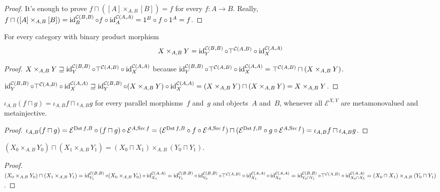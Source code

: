 \begin{proof}
It's enough to prove $f\sqcap([A]\times_{A,B}[B])=f$ for every
$f:A\to B$. Really,
$f\sqcap([A]\times_{A,B}[B])=
\operatorname{id}^{\mathcal{C}(B,B)}_B\circ f\circ\operatorname{id}^{\mathcal{C}(A,A)}_A=
1^B\circ f\circ 1^A=f$.
\end{proof}

\begin{prop}
For every category with binary product morphism
\[X\times_{A,B}Y=
\operatorname{id}^{\mathcal{C}(B,B)}_Y\circ\top^{\mathcal{C}(A,B)}\circ
\operatorname{id}^{\mathcal{C}(A,A)}_X\]
\end{prop}

\begin{proof}
$X\times_{A,B}Y\sqsupseteq
\operatorname{id}^{\mathcal{C}(B,B)}_Y\circ\top^{\mathcal{C}(A,B)}\circ\operatorname{id}^{\mathcal{C}(A,A)}_X$
because
$\operatorname{id}^{\mathcal{C}(B,B)}_Y\circ\top^{\mathcal{C}(A,B)}\circ\operatorname{id}^{\mathcal{C}(A,A)}_X=
\top^{\mathcal{C}(A,B)}\sqcap(X\times_{A,B}Y)$.

$\operatorname{id}^{\mathcal{C}(B,B)}_Y\circ\top^{\mathcal{C}(A,B)}\circ\operatorname{id}^{\mathcal{C}(A,A)}_X\sqsupseteq
\operatorname{id}^{\mathcal{C}(B,B)}_Y\circ(X\times_{A,B}Y)\circ
\operatorname{id}^{\mathcal{C}(A,A)}_X=
(X\times_{A,B}Y)\sqcap(X\times_{A,B}Y)=X\times_{A,B}Y$.
\end{proof}

\begin{prop}
$\iota_{A,B}(f\sqcap g)=\iota_{A,B}f\sqcap\iota_{A,B}g$
for every parallel morphisms~$f$ and~$g$ and objects~$A$
and~$B$, whenever all $\mathcal{E}^{X,Y}$ are metamonovalued
and metainjective.
\end{prop}

\begin{proof}
$\iota_{A,B}(f\sqcap g)=
\mathcal{E}^{\operatorname{Dst} f,B}\circ(f\sqcap g)\circ
\mathcal{E}^{A,\operatorname{Src} f}=
(\mathcal{E}^{\operatorname{Dst} f,B}\circ f\circ\mathcal{E}^{A,\operatorname{Src} f})\sqcap
(\mathcal{E}^{\operatorname{Dst} f,B}\circ g\circ\mathcal{E}^{A,\operatorname{Src} f})=
\iota_{A,B}f\sqcap\iota_{A,B}g$.
\end{proof}

\begin{prop}
$(X_0\times_{A,B}Y_0)\sqcap(X_1\times_{A,B}Y_1)=
(X_0\sqcap X_1)\times_{A,B}(Y_0\sqcap Y_1)$.
\end{prop}

\begin{proof}
$(X_0\times_{A,B}Y_0)\sqcap(X_1\times_{A,B}Y_1)=
\operatorname{id}^{\mathcal{C}(B,B)}_{Y_1}\circ(X_0\times_{A,B}Y_0)\circ
\operatorname{id}^{\mathcal{C}(A,A)}_{X_1}=
\operatorname{id}^{\mathcal{C}(B,B)}_{Y_1}\circ
\operatorname{id}^{\mathcal{C}(B,B)}_{Y_0}\circ
\top^{\mathcal{C}(A,B)}\circ
\operatorname{id}^{\mathcal{C}(A,A)}_{X_1}\circ
\operatorname{id}^{\mathcal{C}(A,A)}_{X_0}=
\operatorname{id}^{\mathcal{C}(B,B)}_{Y_0\sqcap Y_1}\circ
\top^{\mathcal{C}(A,B)}\circ
\operatorname{id}^{\mathcal{C}(A,A)}_{X_0\sqcap X_1}=
(X_0\sqcap X_1)\times_{A,B}(Y_0\sqcap Y_1)$.
\end{proof}

